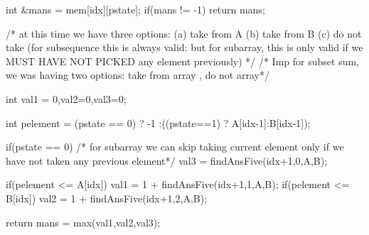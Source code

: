\begin{solution}
\begin{code3}
{        int &mans = mem[idx][pstate];
        if(mans != -1) return mans;
        
        /* at this time we have three options:
            (a) take from A
            (b) take from B
            (c) do not take (for subsequence this is always valid: but for subarray, this is only valid if we MUST HAVE  NOT PICKED any element previously)
        */
        /* Imp for subset sum, we was having two options: take from array , do not array*/
        
        int val1 = 0,val2=0,val3=0;
        
        int pelement = (pstate == 0) ? -1 :((pstate==1) ? A[idx-1]:B[idx-1]);
        
            if(pstate == 0) /* for subarray we can skip taking current element only if we have not taken any previous element*/
            val3 = findAnsFive(idx+1,0,A,B);
        
        if(pelement <= A[idx])
            val1 = 1 + findAnsFive(idx+1,1,A,B);
        if(pelement <= B[idx])
            val2 = 1 + findAnsFive(idx+1,2,A,B);
        
        
        
        return mans = max({val1,val2,val3});
    }
    \end{code3}
\end{solution}